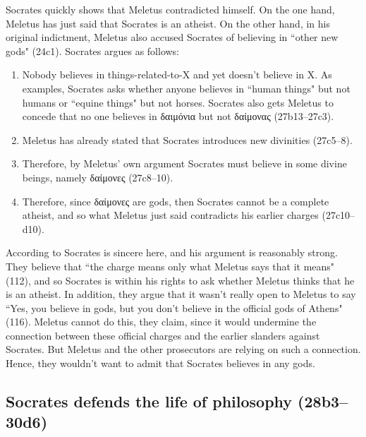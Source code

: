 \documentclass[11pt]{article}
\begin{document}
Socrates quickly shows that Meletus contradicted himself.  On the one hand,
Meletus has just said that Socrates is an atheist.  On the other hand, in his
original indictment, Meletus also accused Socrates of believing in ``other new
gods" (24c1).  Socrates argues as follows:

\begin{enumerate}
    \item Nobody believes in things-related-to-X and yet doesn't believe in X.
        As examples, Socrates asks whether anyone believes in ``human things"
        but not humans or ``equine things" but not horses.  Socrates also gets
        Meletus to concede that no one believes in δαιμόνια but not δαίμονας
        (27b13--27c3).
    \item Meletus has already stated that Socrates introduces new divinities
        (27c5--8).
    \item Therefore, by Meletus' own argument Socrates must believe in some
        divine beings, namely {\g δαίμονες} (27c8--10).
    \item Therefore, since {\g δαίμονες} are gods, then Socrates cannot be
        a complete atheist, and so what Meletus just said contradicts his
        earlier charges (27c10--d10).
\end{enumerate}

According to \citeauthor{brickhouse2004} Socrates is sincere here, and his
argument is reasonably strong.  They believe that ``the charge means only what
Meletus says that it means" (112), and so Socrates is within his rights to ask
whether Meletus thinks that he is an atheist.  In addition, they argue that it
wasn't really open to Meletus to say ``Yes, you believe in gods, but you don't
believe in the official gods of Athens" (116).  Meletus cannot do this, they
claim, since it would undermine the connection between these official charges
and the earlier slanders against Socrates.  But Meletus and the other
prosecutors are relying on such a connection.  Hence, they wouldn't want to
admit that Socrates believes in any gods.



\subsection{Socrates defends the life of philosophy (28b3--30d6)}
\end{document}
